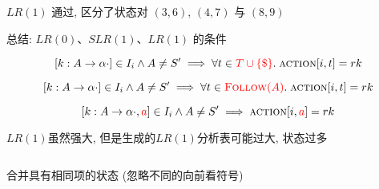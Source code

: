 \begin{frame}{}
  \begin{center}
    \begin{columns}
    \end{columns}

    \vspace{0.60cm}
    $LR(1)$ 通过, 区分了状态对 $(3, 6)$, $(4, 7)$ 与 $(8, 9)$
  \end{center}
\end{frame}

\begin{frame}{}
  \begin{center}
    总结: $LR(0)$、$SLR(1)$、$LR(1)$ 的条件

    \[
      [k: A \to \alpha \cdot] \in I_{i} \land A \neq S' \implies
        \forall t \in \textcolor{red}{T \cup \{\$\}}.\; \textsc{action}[i, t] = rk
    \]

    \[
      [k: A \to \alpha \cdot] \in I_{i} \land A \neq S' \implies
        \forall t \in \textcolor{red}{\textsc{Follow}(A)}.\; \textsc{action}[i, t] = rk
    \]

    \[
      [k: A \to \alpha \cdot, \textcolor{red}{a}] \in I_{i} \land A \neq S' \implies
        \textsc{action}[i, \textcolor{red}{a}] = rk
    \]
  \end{center}
\end{frame}

\begin{frame}{}
  \begin{center}
    $LR(1)$虽然强大, 但是生成的$LR(1)$分析表可能过大, 状态过多

    \begin{columns}
    \end{columns}

    \pause
    \vspace{0.10cm}
     合并具有相同项的状态 (忽略不同的向前看符号)
  \end{center}
\end{frame}

